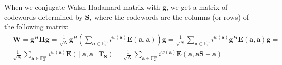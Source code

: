\documentclass{article}
\begin{document}
	
	When we conjugate Walsh-Hadamard matrix with $\mathbf{g}$, we get a matrix of codewords determined by $\mathbf{S}$, where the codewords are the columns (or rows) of the following matrix:
	\begin{align*}
		&\mathbf{W} = \mathbf{g}^H\mathbf{H}\mathbf{g} = \frac{1}{\sqrt{N}}\mathbf{g}^H\left(\sum_{\mathbf{a} \in \mathbb{F}^m_2} i^{w(\mathbf{a})}\mathbf{E}(\mathbf{a},\mathbf{a})\right)\mathbf{g} = \frac{1}{\sqrt{N}}\sum_{\mathbf{a} \in \mathbb{F}^m_2} i^{w(\mathbf{a})}\mathbf{g}^H\mathbf{E}(\mathbf{a},\mathbf{a})\mathbf{g} = \\ &\frac{1}{\sqrt{N}}\sum_{\mathbf{a} \in \mathbb{F}^m_2} i^{w(\mathbf{a})}\mathbf{E}(\left[\mathbf{a},\mathbf{a}\right]\mathbf{T}_\mathbf{S}) = \frac{1}{\sqrt{N}}\sum_{\mathbf{a} \in \mathbb{F}^m_2} i^{w(\mathbf{a})}\mathbf{E}(\mathbf{a},\mathbf{a}\mathbf{S} + \mathbf{a})
	\end{align*}
	
\end{document}
